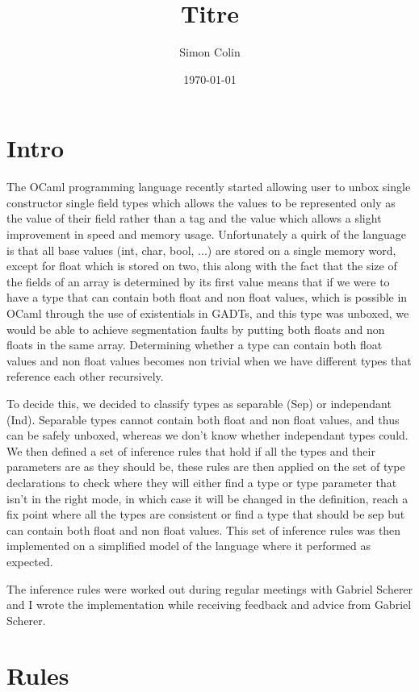\documentclass[a4]{article}
\title{Titre}
\author{Simon Colin}
\date{\today}
\begin{document}
\maketitle

\section{Intro}

The OCaml programming language recently started allowing user to unbox single constructor single field types which allows the values to be represented only as the value of their field rather than a tag and the value which allows a slight improvement in speed and memory usage. Unfortunately a quirk of the language is that all base values (int, char, bool, ...) are stored on a single memory word, except for float which is stored on two, this along with the fact that the size of the fields of an array is determined by its first value means that if we were to have a type that can contain both float and non float values, which is possible in OCaml through the use of existentials in GADTs, and this type was unboxed, we would be able to achieve segmentation faults by putting both floats and non floats in the same array. Determining whether a type can contain both float values and non float values becomes non trivial when we have different types that reference each other recursively.

To decide this, we decided to classify types as separable (Sep) or independant (Ind). Separable types cannot contain both float and non float values, and thus can be safely unboxed, whereas we don't know whether independant types could. We then defined a set of inference rules that hold if all the types and their parameters are as they should be, these rules are then applied on the set of type declarations to check where they will either find a type or type parameter that isn't in the right mode, in which case it will be changed in the definition, reach a fix point where all the types are consistent or find a type that should be sep but can contain both float and non float values. This set of inference rules was then implemented on a simplified model of the language where it performed as expected.

The inference rules were worked out during regular meetings with Gabriel Scherer and I wrote the implementation while receiving feedback and advice from Gabriel Scherer.

\section{Rules}
\end{document}
